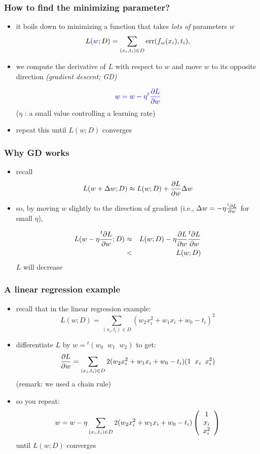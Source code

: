 \documentclass[12pt,dvipdfmx]{beamer}
\newcommand{\ao}[1]{{\color{blue}#1}}
\begin{document}
\begin{frame}
\frametitle{How to find the minimizing parameter?}
\begin{itemize}
\item it boils down to minimizing a function that takes 
  \emph{lots of} parameters $w$
\[ L(\ao{w}; D) = \sum_{(x_i,t_i)\in D} \mbox{err}(f_{\ao{w}}(x_i), t_i), \]

\item we compute \ao{the derivative
  of $L$ with respect to $w$} and move $w$ to its opposite
  direction \ao{\emph{(gradient descent; GD)}}

\[ \ao{w = w - \eta {}^t \pp{L}{w}} \]
($\eta$ : a small value controlling a learning rate)

\item repeat this until $L(w; D)$ converges
\end{itemize}
\end{frame}

\begin{frame}
\frametitle{Why GD works}
\begin{itemize}
\item recall
  \[ L(w + \Delta w; D) \approx L(w; D) + \frac{\partial L}{\partial w} \Delta w \]
  
\item so, by moving $w$ slightly to the direction of gradient (i.e., $\Delta w = - \eta\frac{{}^t\partial L}{\partial w}$ for small $\eta$),

  \begin{eqnarray*}
    L(w - \eta \frac{{}^t\partial L}{\partial w}; D) & \approx & L(w; D) -\eta \frac{\partial L}{\partial w} \frac{{}^t\partial L}{\partial w} \\
                                 & < & L(w; D)
  \end{eqnarray*}
$L$ will decrease
\end{itemize}
\end{frame}


\begin{frame}
\frametitle{A linear regression example}
\begin{itemize}
\item<1-> recall that in the linear regression example:
\[ L(w; D) = \sum_{(x_i,t_i)\in D} (w_2 x_i^2 + w_1 x_i + w_0 - t_i)^2 \]

\item<2-> differentiate $L$ by $w = {}^t(w_0\;\;w_1\;\;w_2)$ to get:
\[ \frac{\partial L}{\partial w} = \sum_{(x_i,t_i)\in D} 2 (w_2 x_i^2 + w_1 x_i + w_0 - t_i) (1\;\;x_i\;\;x_i^2) \]
(remark: we used \ao{a chain rule})

\item<3-> so you repeat:
 \[ w = w - \eta \sum_{(x_i,t_i)\in D} 2 (w_2 x_i^2 + w_1 x_i + w_0 - t_i) \left(\begin{array}{c} 1 \\ x_i \\ x_i^2 \end{array}\right) \]
until $L(w; D)$ converges
\end{itemize}
\end{frame}
\end{document}
